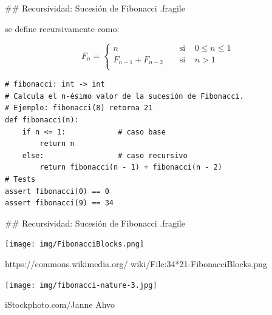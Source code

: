 ## Recursividad: Sucesión de Fibonacci {.fragile}

\bgnblocknormal
{} se define recursivamente como:
\trmblocknormal

\vspace{-2ex}

$$ F_n = \begin{cases}
        n                 & \;\;\;\;\text{si} \;\;\;\; 0 \leq n \leq 1 \\
        F_{n-1} + F_{n-2} & \;\;\;\;\text{si} \;\;\;\; n > 1 \\
    \end{cases}
$$

\vspace{1ex}
\begin{lstlisting}[style=frame02]
# fibonacci: int -> int
# Calcula el n-ésimo valor de la sucesión de Fibonacci.
# Ejemplo: fibonacci(8) retorna 21
def fibonacci(n):
    if n <= 1:            # caso base
        return n
    else:                 # caso recursivo
        return fibonacci(n - 1) + fibonacci(n - 2)
# Tests
assert fibonacci(0) == 0
assert fibonacci(9) == 34
\end{lstlisting}

## Recursividad: Sucesión de Fibonacci {.fragile}

\bgncolumns
{}

\texttt{[image: img/FibonacciBlocks.png]}

\footnotesize{https://commons.wikimedia.org/
wiki/File:34*21-FibonacciBlocks.png}

\texttt{[image: img/fibonacci-nature-3.jpg]}

\footnotesize{iStockphoto.com/Janne Ahvo}

\trmcolumns
